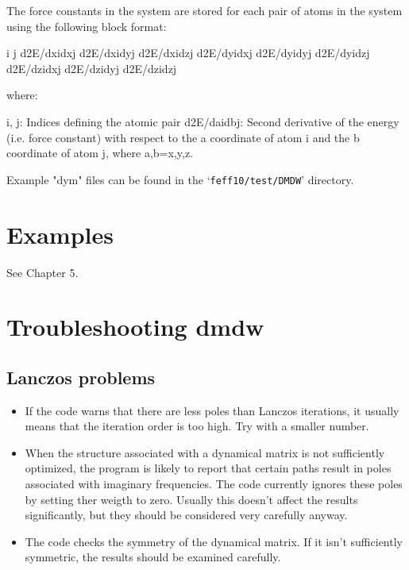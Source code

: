 \documentclass[11pt,oneside]{report} %
\renewcommand{\htmlref}[2]{\hyperlink{#2}{#1}}
\newcommand{\file}[1]{`\texttt{#1}'}
\newcommand{\module}[1]{\textrm{\bf{#1}}}
\renewcommand{\htmlref}[2]{{#1}} %
\begin{document}
\begin{latexonly}
\begin{itemize}
  The force constants in the system are stored for each pair of atoms in the
  system using the following block format:

     i j
     d2E/dxidxj d2E/dxidyj d2E/dxidzj
     d2E/dyidxj d2E/dyidyj d2E/dyidzj
     d2E/dzidxj d2E/dzidyj d2E/dzidzj

  where:
  
     i, j: Indices defining the atomic pair
     d2E/daidbj: Second derivative of the energy (i.e. force constant) with
                 respect to the a coordinate of atom i and the b coordinate of
		 atom j, where a,b={x,y,z}.
\end{itemize}

Example "dym" files can be found in the \file{feff10/test/DMDW} directory.


\section{Examples}
\label{sec:Append-G-DMDW-Example}

See \htmlref{Chapter 5}{sec:DWfactors}.

\section{Troubleshooting \module{dmdw}}
\label{sec:Append-G-DMDW-Trouble}

\subsection{Lanczos problems}
\begin{itemize}
\item If the code warns that there are less poles than Lanczos iterations, it
  usually means that the iteration order is too high. Try with a smaller
  number.

\item When the structure associated with a dynamical matrix is not sufficiently
  optimized, the program is likely to report that certain paths result in
  poles associated with imaginary frequencies. The code currently ignores
  these poles by setting ther weigth to zero. Usually this doesn't affect the
  results significantly, but they should be considered very carefully anyway.

\item The code checks the symmetry of the dynamical matrix. If it isn't sufficiently
  symmetric, the results should be examined carefully.
\end{itemize}



\end{latexonly}
\end{document}
